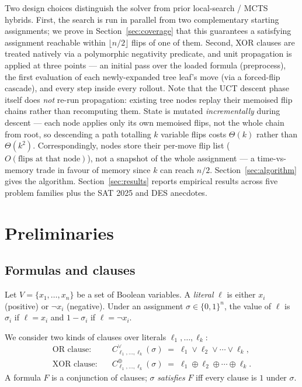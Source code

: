 \documentclass[11pt]{article}
\begin{document}
Two design choices distinguish the solver from prior local-search /
MCTS hybrids. First, the search is run in parallel from two
complementary starting assignments; we prove in
Section~\ref{sec:coverage} that this guarantees a satisfying
assignment reachable within $\lfloor n/2 \rfloor$ flips of one of them.
Second, XOR clauses are treated natively via a polymorphic negativity
predicate, and unit propagation is applied at three points — an
initial pass over the loaded formula (preprocess), the first evaluation
of each newly-expanded tree leaf's move (via a forced-flip cascade),
and every step inside every rollout. Note that the UCT descent phase
itself does \emph{not} re-run propagation: existing tree nodes replay
their memoised flip chains rather than recomputing them. State is
mutated \emph{incrementally} during descent — each node applies only
its own memoised flips, not the whole chain from root, so descending
a path totalling $k$ variable flips costs $\Theta(k)$ rather than
$\Theta(k^2)$. Correspondingly,
nodes store their per-move flip list ($O(\text{flips at that node})$),
not a snapshot of the whole assignment — a time-vs-memory trade in
favour of memory since $k$ can reach $n/2$.
Section~\ref{sec:algorithm} gives the algorithm.
Section~\ref{sec:results} reports empirical results across five
problem families plus the SAT 2025 and DES anecdotes.

\section{Preliminaries}
\label{sec:preliminaries}

\subsection{Formulas and clauses}

Let $V = \{x_1,\dots,x_n\}$ be a set of Boolean variables. A
\emph{literal} $\ell$ is either $x_i$ (positive) or $\neg x_i$
(negative). Under an assignment $\sigma \in \{0,1\}^n$, the value of
$\ell$ is $\sigma_i$ if $\ell = x_i$ and $1-\sigma_i$ if
$\ell = \neg x_i$.

We consider two kinds of clauses over literals $\ell_1,\dots,\ell_k$:
\begin{align}
\text{OR clause:}  \quad & C^\vee_{\ell_1,\dots,\ell_k}(\sigma)
    \;=\; \ell_1 \vee \ell_2 \vee \cdots \vee \ell_k, \\
\text{XOR clause:} \quad & C^\oplus_{\ell_1,\dots,\ell_k}(\sigma)
    \;=\; \ell_1 \oplus \ell_2 \oplus \cdots \oplus \ell_k.
\end{align}
A formula $F$ is a conjunction of clauses; $\sigma$ \emph{satisfies}
$F$ iff every clause is $1$ under $\sigma$.
\end{document}
